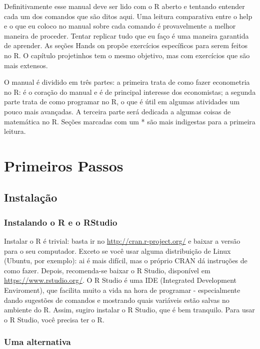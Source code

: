 \documentclass[
]{book}
\begin{document}
Definitivamente esse manual deve ser lido com o R aberto e tentando entender cada um dos comandos que são ditos aqui. Uma leitura comparativa entre o help e o que eu coloco no manual sobre cada comando é provavelmente a melhor maneira de proceder. Tentar replicar tudo que eu faço é uma maneira garantida de aprender. As seções Hands on propõe exercícios específicos para serem feitos no R. O capítulo projetinhos tem o mesmo objetivo, mas com exercícios que são mais extensos.

O manual é dividido em três partes: a primeira trata de como fazer econometria no R: é o coração do manual e é de principal interesse dos economistas; a segunda parte trata de como programar no R, o que é útil em algumas atividades um pouco mais avançadas. A terceira parte será dedicada a algumas coisas de matemática no R. Seções marcadas com um * são mais indigestas para a primeira leitura.

\hypertarget{primeiros-passos}{%
\chapter{Primeiros Passos}\label{primeiros-passos}}

\hypertarget{instalauxe7uxe3o}{%
\section{Instalação}\label{instalauxe7uxe3o}}

\hypertarget{instalando-o-r-e-o-rstudio}{%
\subsection{Instalando o R e o RStudio}\label{instalando-o-r-e-o-rstudio}}

Instalar o R é trivial: basta ir no \url{http://cran.r-project.org/} e baixar a versão para o seu computador. Exceto se você usar alguma distribuição de Linux (Ubuntu, por exemplo): ai é mais difícil, mas o próprio CRAN dá instruções de como fazer. Depois, recomenda-se baixar o R Studio, disponível em \url{https://www.rstudio.org/}. O R Studio é uma IDE (Integrated Development Enviroment), que facilita muito a vida na hora de programar - especialmente dando sugestões de comandos e mostrando quais variáveis estão salvas no ambiente do R. Assim, sugiro instalar o R Studio, que é bem tranquilo. Para usar o R Studio, você precisa ter o R.

\hypertarget{uma-alternativa}{%
\subsection{Uma alternativa}\label{uma-alternativa}}
\end{document}
